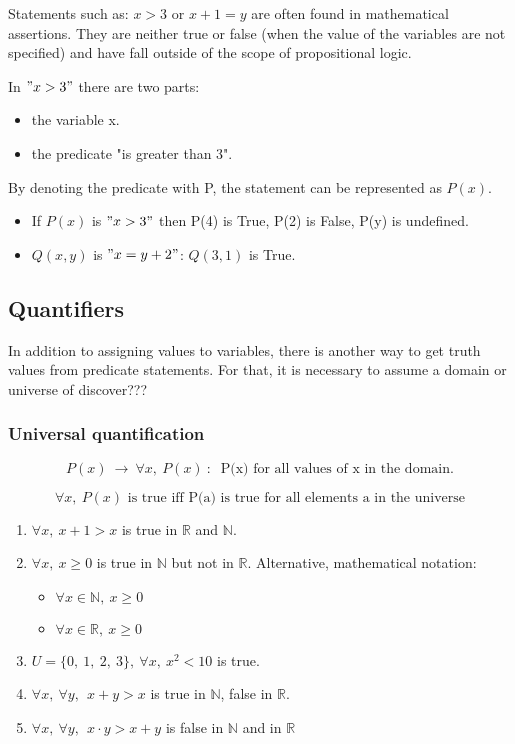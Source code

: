 \documentclass[12pt, a4paper]{book}
\begin{document}
Statements such as: $x>3$ or $x+1=y$ are often found in mathematical assertions. They are neither true or false (when the value of the variables are not specified) and have fall outside of the scope of propositional logic.

In $"x>3"$ there are two parts:
\begin{itemize}
    \item the variable x.
    \item the predicate "is greater than 3".
\end{itemize}

By denoting the predicate with P, the statement can be represented as $P(x)$.

\begin{exmp}
    \begin{itemize}
        \item If $P(x)$ is $"x>3"$ then P(4) is True, P(2) is False, P(y) is undefined.
        \item $Q(x,y)$ is $"x=y+2"$: $Q(3,1)$ is True.
    \end{itemize}
\end{exmp}

\subsection*{Quantifiers}

In addition to assigning values to variables, there is another way to get truth values from predicate statements. For that, it is necessary to assume a domain or universe of discover???

\subsubsection*{Universal quantification}

$$P(x) \ \rightarrow \ \forall x, \ P(x) \ : \ \text{ P(x) for all values of x in the domain}.$$

$$\forall x, \ P(x) \text{ is true iff P(a) is true for all elements a in the universe}$$

\begin{exmp}
    \begin{enumerate}
        \item $\forall x, \ x+1 > x$ is true in $\mathbb{R}$ and $\mathbb{N}$.
        \item $\forall x, \ x \geq 0$ is true in $\mathbb{N}$ but not in $\mathbb{R}$. Alternative, mathematical notation: 
        \begin{itemize}
            \item $\forall x \in \mathbb{N}, \ x \geq 0$
            \item $\forall x \in \mathbb{R}, \ x \geq 0$
        \end{itemize}
        \item $U= \{0, \ 1, \ 2, \ 3 \}, \ \forall x, \ x^2<10$ is true.
        \item $\forall x, \ \forall y, \ \ x+y>x$ is true in $\mathbb{N}$, false in $\mathbb{R}$.
        \item $\forall x, \ \forall y, \ \ x \cdot y >x+y$ is false in $\mathbb{N}$ and in $\mathbb{R}$
    \end{enumerate}
\end{exmp}
\end{document}
